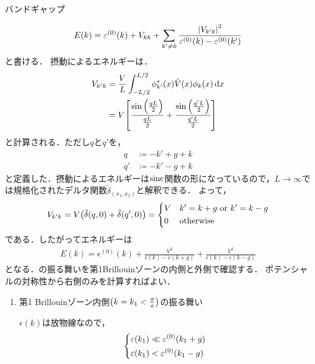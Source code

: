 \documentclass{report}
\begin{document}
\begin{myex}{バンドギャップ}{}
\begin{enumerate}
\begin{align}
          E(k) = \varepsilon^{(0)}(k) + V_{kk} + \sum_{k'\neq k}\frac{\abs{V_{k'k}}^2}{\varepsilon^{(0)}(k) - \varepsilon^{(0)}(k')}
        \end{align}
        と書ける．
        摂動によるエネルギーは．
        \begin{align}
          V_{k'k} &= \frac{V}{L}\int_{-L/2}^{L/2}\phi_{k'}^{*}(x)\hat{V}(x)\phi_k(x)\dd{x} \\
          &= V\qty[\frac{\sin\qty(\frac{qL}{2})}{\frac{qL}{2}} + \frac{\sin\qty(\frac{q'L}{2})}{\frac{q'L}{2}}] 
        \end{align}
        と計算される．ただし$q$と$q'$を，
        \begin{align}
          q &\coloneqq -k' + g + k \\ 
          q' &\coloneqq -k' - g + k
        \end{align}
        と定義した．摂動によるエネルギーは$\mathrm{sinc}$関数の形になっているので，$L\to\infty$では規格化されたデルタ関数$\tilde{\delta}_(x_1, x_2)$と解釈できる．
        よって，
        \begin{align}
          V_{k'k} = V\qty(\tilde{\delta}(q, 0) + \tilde{\delta}(q', 0)) = 
          \begin{dcases}
            V &  k' = k + g\ \mathrm{or}\ k' = k - g\\
            0 & \mathrm{otherwise}
          \end{dcases}
        \end{align}
        である．したがってエネルギーは
        \begin{align}
          E(k) = \epsilon^{(0)}(k) + \frac{V^2}{\epsilon(k) - \epsilon(k + g)} + \frac{V^2}{\epsilon(k) - \epsilon(k - g)}\label{2nd-order-perturbation-eigenvalue-in-electron}
        \end{align}
        となる．の振る舞いを第1Brillouinゾーンの内側と外側で確認する．
        ポテンシャルの対称性から右側のみを計算すればよい．
        \begin{enumerate}
          \item 第1 Brillouinゾーン内側$\qty(k = k_1 < \frac{\pi}{a})$の振る舞い\par
          $\epsilon(k)$は放物線なので，
          \begin{align}
            \begin{dcases}
              \epsilon(k_1) \ll \epsilon^{(0)}(k_1 + g) \\
              \epsilon(k_1) < \epsilon^{(0)}(k_1 - g)
            \end{dcases}

\end{align}
\end{enumerate}
\end{enumerate}
\end{myex}
\end{document}

